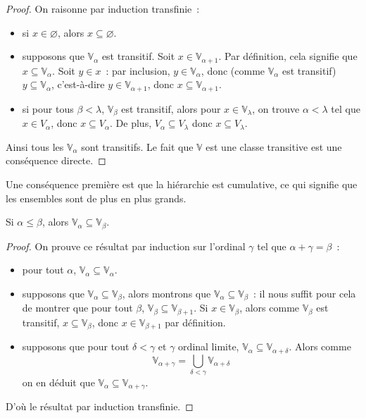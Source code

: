 \begin{proof}
  On raisonne par induction transfinie~:
  \begin{itemize}
  \item si $x\in \varnothing$, alors $x\subseteq\varnothing$.
  \item supposons que $\mathbb V_\alpha$ est transitif. Soit
    $x\in\mathbb V_{\alpha+1}$. Par définition, cela signifie que
    $x\subseteq \mathbb V_\alpha$. Soit $y\in x$~: par inclusion,
    $y\in \mathbb V_\alpha$, donc (comme $\mathbb V_\alpha$ est transitif)
    $y\subseteq \mathbb V_\alpha$, c'est-à-dire $y\in \mathbb V_{\alpha + 1}$,
    donc $x\subseteq \mathbb V_{\alpha + 1}$.
  \item si pour tous $\beta < \lambda$, $\mathbb V_\beta$ est transitif, alors
    pour $x\in \mathbb V_\lambda$, on trouve $\alpha < \lambda$ tel que
    $x\in V_\alpha$, donc $x\subseteq V_\alpha$. De plus,
    $V_\alpha \subseteq V_\lambda$ donc $x\subseteq V_\lambda$.
  \end{itemize}
  Ainsi tous les $\mathbb V_\alpha$ sont transitifs. Le fait que $\mathbb V$ est
  une classe transitive est une conséquence directe.
\end{proof}

Une conséquence première est que la hiérarchie est cumulative, ce qui signifie
que les ensembles sont de plus en plus grands.

\begin{property}
  Si $\alpha \leq \beta$, alors $\mathbb V_\alpha\subseteq \mathbb V_\beta$.
\end{property}

\begin{proof}
  On prouve ce résultat par induction sur l'ordinal $\gamma$ tel que
  $\alpha + \gamma = \beta$~:
  \begin{itemize}
  \item pour tout $\alpha$, $\mathbb V_\alpha \subseteq \mathbb V_\alpha$.
  \item supposons que $\mathbb V_\alpha \subseteq \mathbb V_\beta$, alors
    montrons que $\mathbb V_\alpha \subseteq \mathbb V_\beta$~: il nous suffit
    pour cela de montrer que pour tout $\beta$,
    $\mathbb V_\beta \subseteq \mathbb V_{\beta + 1}$. Si $x \in \mathbb V_\beta$,
    alors comme $\mathbb V_\beta$ est transitif, $x\subseteq \mathbb V_\beta$,
    donc $x\in \mathbb V_{\beta + 1}$ par définition.
  \item supposons que pour tout $\delta < \gamma$ et $\gamma$ ordinal limite,
    $\mathbb V_\alpha \subseteq \mathbb V_{\alpha + \delta}$. Alors
    comme
    \[\mathbb V_{\alpha + \gamma} =
    \bigcup_{\delta < \gamma} \mathbb V_{\alpha + \delta}\]
    on en déduit que $\mathbb V_\alpha \subseteq \mathbb V_{\alpha + \gamma}$.
  \end{itemize}
  D'où le résultat par induction transfinie.
\end{proof}

